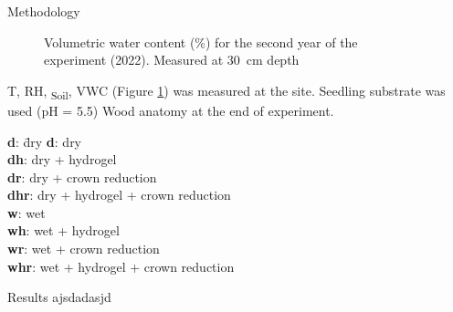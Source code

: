 \documentclass[final]{beamer}
\newlength{\sepwidth}
\newlength{\colwidth}
\newcommand{\separatorcolumn}{\begin{column}{\sepwidth}\end{column}}
\begin{document}
\begin{frame}[t]
\begin{columns}[t]
\begin{column}{\colwidth}
\begin{block}{Methodology}
    \begin{minipage}[t]{0.45\textwidth}
        \begin{figure}
            
            \caption{Volumetric water content (\%) for the second year of the experiment (2022). Measured at \SI{30}{\centi\meter} depth}
            \label{fig:vwc}
        \end{figure}
    \end{minipage}\hfill
    \begin{minipage}[t]{0.45\textwidth}
        T, RH, \Psi\textsubscript{Soil}, VWC (Figure \ref{fig:vwc}) was measured at the site. Seedling substrate was used (pH = 5.5) Wood anatomy at the end of experiment.
        \begin{tabbing}
            \textbf{d}: \quad\= dry \kill
            \textbf{d}: \>  dry \\
            \textbf{dh}: \>  dry + hydrogel \\
            \textbf{dr}: \>  dry + crown reduction\\
            \textbf{dhr}: \>  dry + hydrogel + crown reduction \\
            \textbf{w}: \>  wet \\
            \textbf{wh}: \>  wet + hydrogel \\
            \textbf{wr}: \>  wet + crown reduction\\
            \textbf{whr}: \>  wet + hydrogel + crown reduction
        \end{tabbing}
    \end{minipage}\hfill
\end{block}

\begin{block}{Results}
ajsdadasjd \textcite{vaganov1990}

\end{block}

\end{column}


\begin{column}{\colwidth}


\end{column}
\end{columns}
\end{frame}
\end{document}
